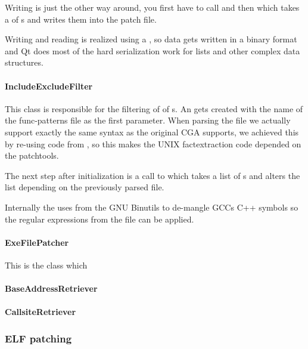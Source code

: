 Writing is just the other way around, you first have to call  and then  which takes a  of s and writes them into the patch file.

Writing and reading is realized using a , so data gets written in a binary format and Qt does most of the hard serialization work for lists and other complex data structures.

\paragraph{IncludeExcludeFilter}

This class is responsible for the filtering of  of s.   An  gets created with the name of the func-patterns file as the first parameter.  When parsing the file we actually support exactly the same syntax as the original CGA supports, we achieved this by re-using code from , so this makes the UNIX factextraction code depended on the patchtools.

The next step after initialization is a call to  which takes a list of s and alters the list depending on the previously parsed file.

Internally the  uses  from the GNU Binutils to de-mangle GCCs C++ symbols so the regular expressions from the file can be applied.

\paragraph{ExeFilePatcher} This is the class which 

\paragraph{BaseAddressRetriever}

\paragraph{CallsiteRetriever}




\subsubsection{ELF patching} 

